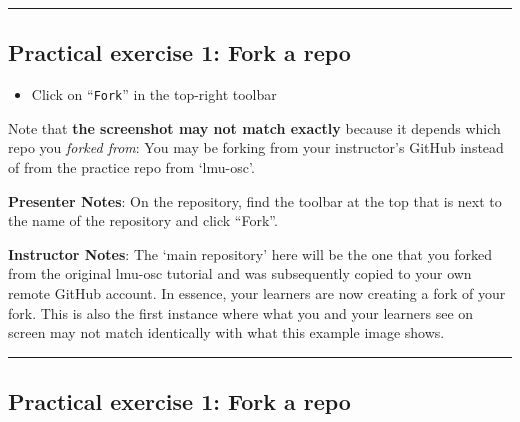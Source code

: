 \documentclass[
  letterpaper,
  DIV=11,
  numbers=noendperiod]{scrartcl}
\providecommand{\tightlist}{%
  \setlength{\itemsep}{0pt}\setlength{\parskip}{0pt}}
\begin{document}
\begin{center}\rule{0.5\linewidth}{0.5pt}\end{center}

\subsection{Practical exercise 1: Fork a
repo}\label{practical-exercise-1-fork-a-repo-1}

\begin{itemize}
\tightlist
\item[$\square$]
  Click on ``\texttt{Fork}'' in the top-right toolbar
\end{itemize}

\begin{tcolorbox}[enhanced jigsaw, arc=.35mm, bottomrule=.15mm, bottomtitle=1mm, breakable, colback=white, colbacktitle=quarto-callout-important-color!10!white, colframe=quarto-callout-important-color-frame, coltitle=black, left=2mm, leftrule=.75mm, opacityback=0, opacitybacktitle=0.6, rightrule=.15mm, title=\textcolor{quarto-callout-important-color}{\faExclamation}\hspace{0.5em}{Something does not look the same?}, titlerule=0mm, toprule=.15mm, toptitle=1mm]

Note that \textbf{the screenshot may not match exactly} because it
depends which repo you \emph{forked from}: You may be forking from your
instructor's GitHub instead of from the practice repo from `lmu-osc'.

\end{tcolorbox}

\textbf{Presenter Notes}: On the repository, find the toolbar at the top
that is next to the name of the repository and click ``Fork''.

\textbf{Instructor Notes}: The `main repository' here will be the one
that you forked from the original lmu-osc tutorial and was subsequently
copied to your own remote GitHub account. In essence, your learners are
now creating a fork of your fork. This is also the first instance where
what you and your learners see on screen may not match identically with
what this example image shows.

\begin{center}\rule{0.5\linewidth}{0.5pt}\end{center}

\subsection{Practical exercise 1: Fork a
repo}\label{practical-exercise-1-fork-a-repo-2}
\end{document}

